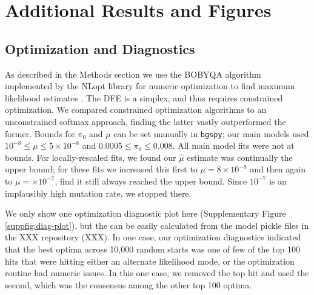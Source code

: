\documentclass[11pt]{article}
\begin{document}
\section{Additional Results and Figures}

\subsection{Optimization and Diagnostics}
\label{supp:optim}

As described in the Methods section we use the BOBYQA algorithm implemented by
the NLopt library for numeric optimization to find maximum likelihood estimates
\parencite{Powell2009-jm,Johnson2007-tl}. The DFE is a simplex, and thus
requires constrained optimization. We compared constrained optimization
algorithms to an unconstrained softmax approach, finding the latter vastly
outperformed the former. Bounds for $\pi_0$ and $\mu$ can be set manually in
\texttt{bgspy}; our main models used $10^{-8} \le \mu \le 5 \times 10^{-8}$ and
$0.0005 \le \pi_0 \le 0.008$. All main model fits were not at bounds. For
locally-rescaled fits, we found our $\widehat{\mu}$ estimate was continually
the upper bound; for these fits we increased this first to $\mu = 8 \times
10^{-8}$ and then again to $\mu = \times 10^{-7}$, find it still always reached
the upper bound. Since $10^{-7}$ is an implausibly high mutation rate, we
stopped there.

We only show one optimization diagnostic plot here (Supplementary Figure
\ref{suppfig:diag-plot}), but the can be easily calculated from the model
pickle files in the XXX repository (XXX). In one case, our optimization
diagnostics indicated that the best optima across 10,000 random starts was one
of few of the top 100 hits that were hitting either an alternate likelihood
mode, or the optimization routine had numeric issues. In this one case, we
removed the top hit and used the second, which was the consensus among the
other top 100 optima. 
\end{document}
